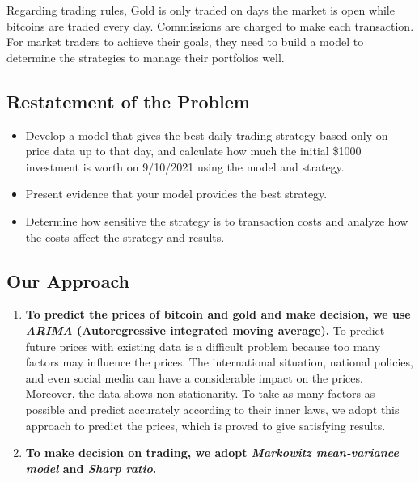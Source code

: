 \documentclass[12pt,a4paper]{article}
\newcommand{\Predictor}{ARIMA }
\newcommand{\Decision}{Markowitz mean-variance model }
\newcommand{\DecisionAssessment}{Sharp ratio}
\begin{document}
\begin{spacing}{1.2}
 Regarding trading rules, Gold is only traded on days the market is open while bitcoins are traded every day. Commissions are charged to make each transaction. For market traders to achieve their goals, they need to build a model to determine the strategies to manage their portfolios well.

\subsection{Restatement of the Problem}

\begin{itemize}
	\item Develop a model that gives the best daily trading strategy based only on price data up 
	to that day, and calculate how much the initial \$1000 investment is worth on 9/10/2021 using the 
	model and strategy.
	
	\item Present evidence that your model provides the best strategy.
	
	\item Determine how sensitive the strategy is to transaction costs and analyze how the costs
	affect the strategy and results.
	
\end{itemize}

\subsection{Our Approach}

\begin{enumerate}
	\item \textbf{To predict the prices of bitcoin and gold and make decision, we use \textit{\Predictor} (Autoregressive integrated moving average).}
	To predict future prices with existing data is a difficult problem because too many factors may influence the prices. The international situation, national policies, and even social media can have a considerable impact on the prices. Moreover, the data shows non-stationarity. To take as many factors as possible and predict accurately according to their inner laws, we adopt this approach to predict the prices, which is proved to give satisfying results.
	
	\item \textbf{To make decision on trading, we adopt \textit{\Decision} and \textit{\DecisionAssessment}. }
\end{enumerate}


\end{spacing}
\end{document}
